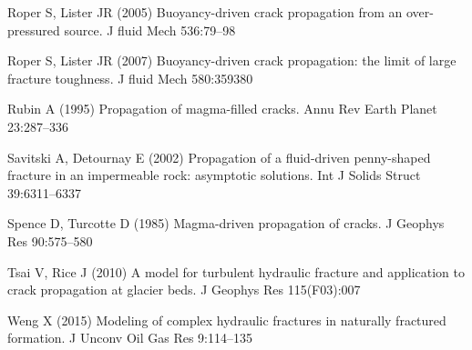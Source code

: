 \documentclass[main.tex]{subfiles}
\begin{document}
Roper S, Lister JR (2005) Buoyancy-driven crack propagation from an over-pressured source. J fluid Mech 536:79–98

Roper S, Lister JR (2007) Buoyancy-driven crack propagation: the limit of large fracture toughness. J fluid Mech 580:359380

Rubin A (1995) Propagation of magma-filled cracks. Annu Rev Earth Planet 23:287–336

Savitski A, Detournay E (2002) Propagation of a fluid-driven penny-shaped fracture in an impermeable rock: asymptotic solutions. Int J Solids Struct 39:6311–6337

Spence D, Turcotte D (1985) Magma-driven propagation of cracks. J Geophys Res 90:575–580

Tsai V, Rice J (2010) A model for turbulent hydraulic fracture and application to crack propagation at glacier beds. J Geophys Res 115(F03):007

Weng X (2015) Modeling of complex hydraulic fractures in naturally fractured formation. J Unconv Oil Gas Res 9:114–135

\newpage
\setcounter{figure}{0}
\setcounter{subsection}{0}
\setcounter{equation}{0}
\end{document}
